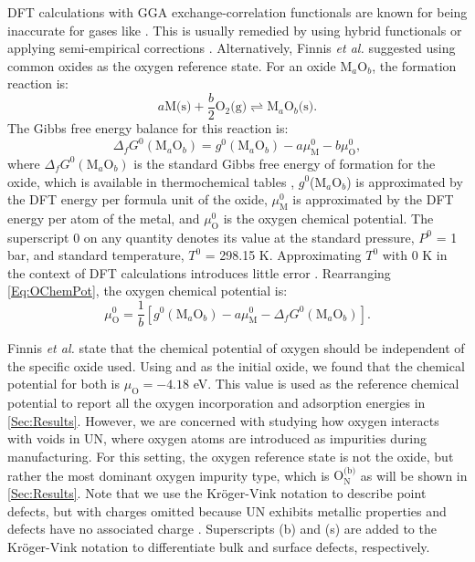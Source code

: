 \documentclass[preprint,12pt,sort&compress]{elsarticle}
\newcommand{\?}{\stackrel{?}{=}}
\begin{document}
DFT calculations with GGA exchange-correlation functionals are known for being inaccurate for gases like  \cite{Bocharov2013}. This is usually remedied by using hybrid functionals or applying semi-empirical corrections \cite{Sargeant2021}. Alternatively, Finnis \textit{et al.} \cite{Finnis2005} suggested using common oxides as the oxygen reference state. For an oxide M$_a$O$_b$, the formation reaction is:
\begin{equation}
a \text{M(s)} + \frac{b}{2} \text{O$_2$(g)} \rightleftharpoons \text{M$_a$O$_b$(s)}.
\end{equation}
The Gibbs free energy balance for this reaction is:
\begin{equation}
\Delta_f G^0 (\text{M$_a$O$_b$}) = g^0(\text{M$_a$O$_b$}) - a \mu_\text{M}^0 - b \mu_\text{O}^0,
\label{Eq:OChemPot}
\end{equation}
where $\Delta_f G^0 (\text{M$_a$O$_b$})$ is the standard Gibbs free energy of formation for the oxide, which is available in thermochemical tables \cite{Linstrom2024}, $g^0$(M$_a$O$_b$) is approximated by the DFT energy per formula unit of the oxide, $\mu_\text{M}^0$ is approximated by the DFT energy per atom of the metal, and $\mu_\text{O}^0$ is the oxygen chemical potential. The superscript 0 on any quantity denotes its value at the standard pressure, $P^0$ = 1 bar, and standard temperature, $T^0$ = 298.15 K. Approximating $T^0$ with 0 K in the context of DFT calculations introduces little error \cite{Finnis2005}. Rearranging \cref{Eq:OChemPot}, the oxygen chemical potential is:
\begin{equation}
\mu_\text{O}^0 = \frac{1}{b} \left[ g^0(\text{M$_a$O$_b$}) - a \mu_\text{M}^0 - \Delta_f G^0 (\text{M$_a$O$_b$}) \right].
\label{Eq:OxidePot}
\end{equation}

Finnis \textit{et al.} state that the chemical potential of oxygen should be independent of the specific oxide used. Using  and  as the initial oxide, we found that the chemical potential for both is $\mu_\text{O} = - 4.18$ eV. This value is used as the reference chemical potential to report all the oxygen incorporation and adsorption energies in \cref{Sec:Results}. However, we are concerned with studying how oxygen interacts with voids in UN, where oxygen atoms are introduced as impurities during manufacturing. For this setting, the oxygen reference state is not the oxide, but rather the most dominant oxygen impurity type, which is $\text{O}_\text{N}^\text{(b)}$ as will be shown in \cref{Sec:Results}. Note that we use the Kröger-Vink notation \cite{Kroger1956} to describe point defects, but with charges omitted because UN exhibits metallic properties and defects have no associated charge \cite{Cooper2023}. Superscripts (b) and (s) are added to the Kröger-Vink notation to differentiate bulk and surface defects, respectively.
\end{document}
